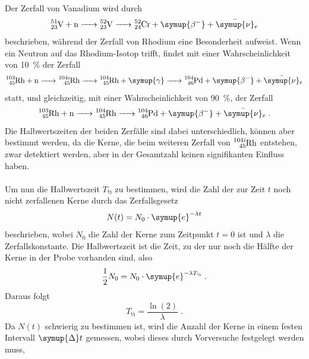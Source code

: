     Der Zerfall von Vanadium wird durch
    \begin{equation*}
        \ce{^{51}_{23}V + n -> ^{52}_{23}V -> ^{52}_{24}Cr + \symup{\beta^{-}} + \bar{\symup{\nu}}_e}
    \end{equation*}
    beschrieben,
    während der Zerfall von Rhodium eine Besonderheit aufweist.
    Wenn ein Neutron auf das Rhodium-Isotop trifft,
    findet mit einer Wahrscheinlichkeit von \SI{10}{\percent} der Zerfall
    \begin{equation*}
        \ce{^{103}_{45}Rh + n -> ^{104i}_{45}Rh -> ^{104}_{45}Rh + \symup{\gamma} -> ^{104}_{46}Pd + \symup{\beta^{-}} + \bar{\symup{\nu}}_e}
    \end{equation*}
    statt,
    und gleichzeitig,
    mit einer Wahrscheinlichkeit von \SI{90}{\percent}, der Zerfall
    \begin{equation*}
        \ce{^{103}_{45}Rh + n -> ^{104}_{45}Rh -> ^{104}_{46}Pd + \symup{\beta^{-}} + \bar{\symup{\nu}}_e} \; .
    \end{equation*}
    Die Halbwertszeiten der beiden Zerfälle sind dabei unterschiedlich,
    können aber bestimmt werden,
    da die Kerne, die beim weiteren Zerfall von $\ce{^{104i}_{45}Rh}$ entstehen,
    zwar detektiert werden, aber in der Gesamtzahl keinen signifikanten Einfluss haben.\\
    \\
    Um nun die Halbwertszeit $T_\text{½}$ zu bestimmen,
    wird die Zahl der zur Zeit $t$ noch nicht zerfallenen Kerne durch das Zerfallsgesetz
    \begin{equation}
        \label{eqn:zerfallsgesetz}
        N(t) = N_0 \cdot \symup{e}^{-\lambda t}
    \end{equation}
    beschrieben,
    wobei $N_0$ die Zahl der Kerne zum Zeitpunkt $t=0$ ist und $\lambda$ die Zerfallskonstante.
    Die Halbwertszeit ist die Zeit,
    zu der nur noch die Hälfte der Kerne in der Probe vorhanden sind,
    also
    \begin{equation*}
        \frac{1}{2} N_0 = N_0 \cdot \symup{e}^{-\lambda T_\text{½}} \; .
    \end{equation*}
    Daraus folgt
    \begin{equation}
        \label{eqn:Halbwertszeit}
        T_\text{½} = \frac{\operatorname{ln}(2)}{\lambda} \; .
    \end{equation}
    Da $N(t)$ schwierig zu bestimmen ist,
    wird die Anzahl der Kerne in einem festen Intervall $\symup{\Delta}t$ gemessen,
    wobei dieses durch Vorversuche festgelegt werden muss,
